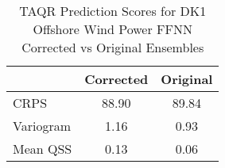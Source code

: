
\begin{table}[h!]
\centering
\begin{tabular}{|l|c|c|}
\hline
\textbf{} & \textbf{Corrected} & \textbf{Original} \\ \hline
CRPS       & 88.90       & 89.84      \\ \hline
Variogram  & 1.16  & 0.93 \\ \hline
Mean QSS   & 0.13        & 0.06       \\ \hline
\end{tabular}
\caption{TAQR Prediction Scores for DK1 Offshore Wind Power FFNN Corrected vs Original Ensembles}
\label{tab:comparison}
\end{table}

